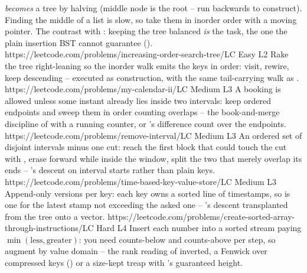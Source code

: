 \begin{mixedset}
{    \emph{becomes} a tree by halving (middle node is the root --  run backwards to
    construct). Finding the middle of a list is slow, so take them in inorder order with a moving
    pointer. The contrast with : keeping the tree balanced \emph{is} the task,
    the one the plain insertion BST cannot guarantee ().}
    {https://leetcode.com/problems/increasing-order-search-tree/}{LC Easy L2}
    {Rake the tree right-leaning so the inorder walk emits the keys in order: visit,
    rewire, keep descending --  executed as construction, with
    the same tail-carrying walk as .}
    {https://leetcode.com/problems/my-calendar-ii/}{LC Medium L3}
    {A booking is allowed unless some instant already lies inside two intervals: keep
    ordered endpoints and sweep them in  order counting
    overlaps -- the book-and-merge discipline of  with a running
    counter, or 's difference count over the endpoints.}
    {https://leetcode.com/problems/remove-interval/}{LC Medium L3}
    {An ordered set of disjoint intervals minus one cut: reach the first block that
    could touch the cut with , erase forward while inside the
    window, split the two that merely overlap its ends -- 's
    descent on interval starts rather than plain keys.}
    {https://leetcode.com/problems/time-based-key-value-store/}{LC Medium L3}
    {Append-only versions per key: each key owns a sorted line of timestamps, so
     is one  for the latest stamp not exceeding the
    asked one -- 's descent transplanted from the tree onto a
    vector.}
    {https://leetcode.com/problems/create-sorted-array-through-instructions/}{LC Hard L4}
    {Insert each number into a sorted stream paying $\min(\text{less},\text{greater})$:
    you need counts-below and counts-above per step, so augment by value domain --
    the rank reading of  inverted, a Fenwick over compressed keys
    () or a size-kept treap with 's guaranteed height.}
\end{mixedset}




